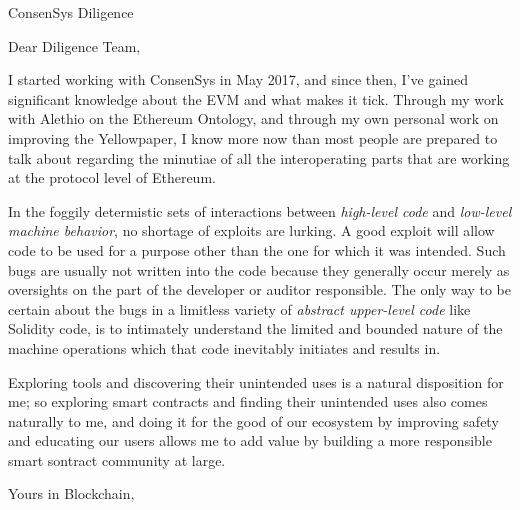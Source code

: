 \documentclass[
	pagenumber=false, %
	parskip=half, %
	fromalign=right, %
	foldmarks=true, %
	addrfield=false ]{scrlttr2}
\date{\today} %
\begin{document}
 
\begin{letter}{ConsenSys Diligence} %


\opening{Dear Diligence Team,}

	I started working with ConsenSys in May 2017, and since then, I've gained significant knowledge about the EVM and what makes it tick. Through my work with Alethio on the Ethereum Ontology, and through my own personal work on improving the Yellowpaper, I know more now than most people are prepared to talk about regarding the minutiae of all the interoperating parts that are working at the protocol level of Ethereum. 

	In the foggily determistic sets of interactions between \textit{high-level code} and \textit{low-level machine behavior}, no shortage of exploits are lurking. A good exploit will allow code to be used for a purpose other than the one for which it was intended. Such bugs are usually not written into the code because they generally occur merely as oversights on the part of the developer or auditor responsible. The only way to be certain about the bugs in a limitless variety of \textsl{abstract upper-level code} like Solidity code, is to intimately understand the limited and bounded nature of the machine operations which that code inevitably initiates and results in. 
	
	 Exploring tools and discovering their unintended uses is a natural disposition for me; so exploring smart contracts and finding their unintended uses also comes naturally to me, and doing it for the good of our ecosystem by improving safety and educating our users allows me to add value by building a more responsible smart sontract community at large. 

\closing{Yours in Blockchain,}



\end{letter}
 
\end{document}
